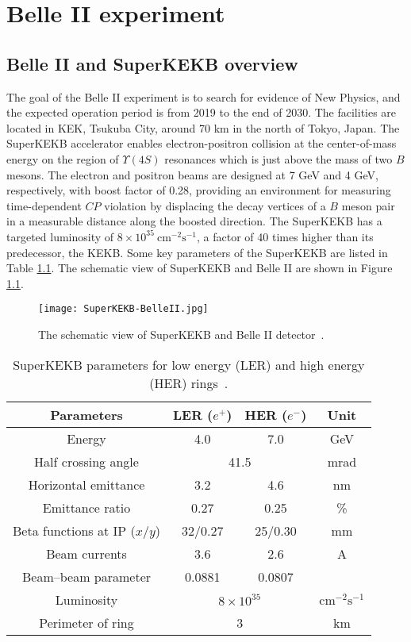 \chapter{Belle II experiment}
\section{Belle II and SuperKEKB overview}
The goal of the Belle II experiment is to search for evidence of New Physics, and the expected operation period is from 2019 to the end of 2030. The facilities are located in KEK, Tsukuba City, around 70 km in the north of Tokyo, Japan. The SuperKEKB accelerator enables electron-positron collision at the center-of-mass energy on the region of $\Upsilon(4S)$ resonances which is just above the mass of two $B$ mesons. The electron and positron beams are designed at 7 GeV and 4 GeV, respectively, with boost factor of 0.28, providing an environment for measuring time-dependent $CP$ violation by displacing the decay vertices of a $B$ meson pair in a measurable distance along the boosted direction. The SuperKEKB has a targeted luminosity of $8\times 10^{35}\: \text{cm}^{-2} \text{s}^{-1}$, a factor of 40 times higher than its predecessor, the KEKB.  Some key parameters of the SuperKEKB are listed in Table \ref{tab:superkekb_pars}. The schematic view of SuperKEKB and Belle II are shown in Figure \ref{fig:superkekb_belle2}.

\begin{figure}
	\centering 
	\texttt{[image: SuperKEKB-BelleII.jpg]}
	\caption{The schematic view of SuperKEKB and Belle II detector~\cite{Abe:2010gxa}.}
	\label{fig:superkekb_belle2}
\end{figure}

\begin{table}[H]
	\centering
	\large
	\caption{SuperKEKB parameters for low energy (LER) and high energy (HER) rings~\cite{b2book}.}
	\label{tab:superkekb_pars}
	\begin{tabular}{c c c c}
		\toprule
		
		Parameters & LER ($e^+$) & HER ($e^-$) & Unit\\
		\hline
		Energy & 4.0 & 7.0 & GeV\\
		Half crossing angle & \multicolumn{2}{c}{41.5} & mrad\\
		Horizontal emittance & 3.2 & 4.6 & nm \\
		Emittance ratio & 0.27 & 0.25 & \%\\
		Beta functions at IP ($x$/$y$) & 32/0.27 & 25/0.30 & mm\\
		Beam currents & 3.6 & 2.6 &  A \\
		Beam–beam parameter & 0.0881 & 0.0807 & {}\\
		Luminosity & \multicolumn{2}{c}{$8\times 10^{35}$} &  $\text{cm}^{-2} \text{s}^{-1}$\\
		Perimeter of ring & \multicolumn{2}{c}{3} & km\\
		
		\bottomrule
	\end{tabular}
\end{table}


